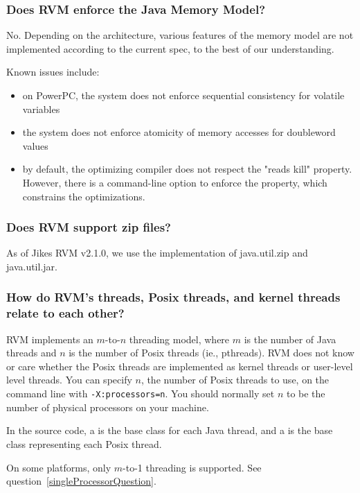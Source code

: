 \subsubsection{Does RVM enforce the Java Memory Model?}

No. Depending on the architecture, various features of the memory model
are not implemented according to the current spec, to the best of our
understanding.

Known issues include:
\begin{itemize}
\item on PowerPC\PowerPCTMFootnote, the system does not enforce
sequential consistency for 
volatile variables
\item the system does not enforce atomicity of memory accesses for
doubleword values
\item by default, the optimizing compiler does not respect the "reads
kill" property.  However, there is a command-line option to enforce the
property, which constrains the optimizations.
\end{itemize}

\subsubsection{Does RVM support zip files?}

As of Jikes RVM v2.1.0, we use the  
implementation of java.util.zip and java.util.jar. 

\subsubsection{How do RVM's threads, Posix threads, and kernel
threads relate to each other?}

RVM implements an $m$-to-$n$ threading model, where $m$ is the number of 
Java threads and $n$ is the number of Posix threads (ie., pthreads).  RVM
does not know or care whether the Posix threads are implemented as kernel
threads or user-level level threads.  You can specify $n$, the number of
Posix threads to use, on the command line with {\tt -X:processors=n}.
You should normally set $n$ to be the number of physical processors on
your machine.  

In the source code, a 
is the base class for each Java
thread, and a 
is the base class representing each
Posix thread.  

On some platforms, only $m$-to-1 threading is supported.  See 
question~\ref{singleProcessorQuestion}.

